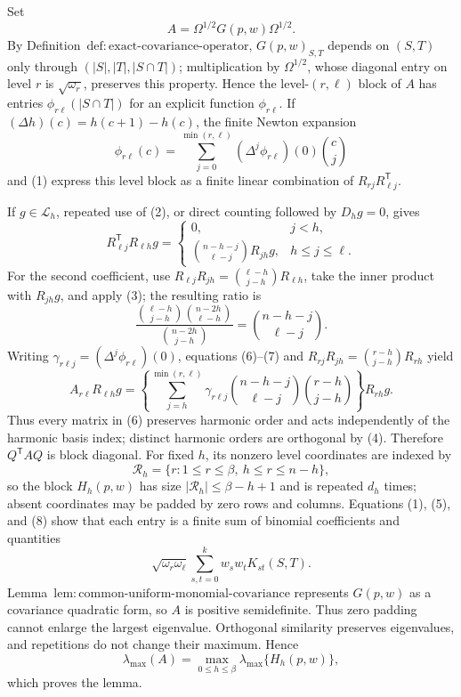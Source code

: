 Set
\[
A=\Omega^{1/2}G(p,w)\Omega^{1/2}.
\]
By Definition~\(\mathrm{def{:}exact\text{-}covariance\text{-}operator}\), \(G(p,w)_{S,T}\) depends on \((S,T)\) only through \((|S|,|T|,|S\cap T|)\); multiplication by \(\Omega^{1/2}\), whose diagonal entry on level \(r\) is \(\sqrt{\omega_r}\), preserves this property.  Hence the level-\((r,\ell)\) block of \(A\) has entries \(\phi_{r\ell}(|S\cap T|)\) for an explicit function \(\phi_{r\ell}\).  If \((\Delta h)(c)=h(c+1)-h(c)\), the finite Newton expansion
\[
\phi_{r\ell}(c)
=\sum_{j=0}^{\min(r,\ell)}(\Delta^j\phi_{r\ell})(0)\binom cj
\tag{6}
\]
and (1) express this level block as a finite linear combination of \(R_{rj}R_{\ell j}^{\mathsf T}\).

If \(g\in\mathcal L_h\), repeated use of (2), or direct counting followed by \(D_hg=0\), gives
\[
R_{\ell j}^{\mathsf T}R_{\ell h}g
=\begin{cases}
0,&j<h,\\
\displaystyle\binom{n-h-j}{\ell-j}R_{jh}g,&h\le j\le\ell.
\end{cases}
\tag{7}
\]
For the second coefficient, use \(R_{\ell j}R_{jh}=\binom{\ell-h}{j-h}R_{\ell h}\), take the inner product with \(R_{jh}g\), and apply (3); the resulting ratio is
\[
\frac{\binom{\ell-h}{j-h}\binom{n-2h}{\ell-h}}
{\binom{n-2h}{j-h}}
=\binom{n-h-j}{\ell-j}.
\]
Writing \(\gamma_{r\ell j}=(\Delta^j\phi_{r\ell})(0)\), equations (6)--(7) and \(R_{rj}R_{jh}=\binom{r-h}{j-h}R_{rh}\) yield
\[
A_{r\ell}R_{\ell h}g
=\left\{
\sum_{j=h}^{\min(r,\ell)}
\gamma_{r\ell j}
\binom{n-h-j}{\ell-j}
\binom{r-h}{j-h}
\right\}R_{rh}g.
\tag{8}
\]
Thus every matrix in (6) preserves harmonic order and acts independently of the harmonic basis index; distinct harmonic orders are orthogonal by (4).  Therefore \(Q^{\mathsf T}AQ\) is block diagonal.  For fixed \(h\), its nonzero level coordinates are indexed by
\[
\mathcal R_h=\{r:1\le r\le\beta,\ h\le r\le n-h\},
\]
so the block \(H_h(p,w)\) has size \(|\mathcal R_h|\le\beta-h+1\) and is repeated \(d_h\) times; absent coordinates may be padded by zero rows and columns.  Equations (1), (5), and (8) show that each entry is a finite sum of binomial coefficients and quantities
\[
\sqrt{\omega_r\omega_\ell}\sum_{s,t=0}^kw_sw_tK_{st}(S,T).
\]
Lemma~\(\mathrm{lem{:}common\text{-}uniform\text{-}monomial\text{-}covariance}\) represents \(G(p,w)\) as a covariance quadratic form, so \(A\) is positive semidefinite.  Thus zero padding cannot enlarge the largest eigenvalue.  Orthogonal similarity preserves eigenvalues, and repetitions do not change their maximum.  Hence
\[
\lambda_{\max}(A)
=\max_{0\le h\le\beta}\lambda_{\max}\{H_h(p,w)\},
\]
which proves the lemma.